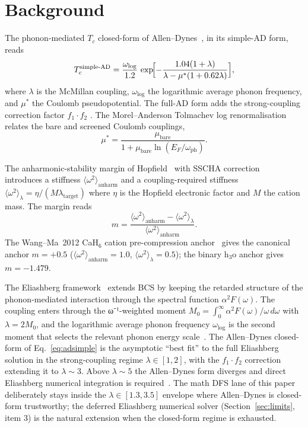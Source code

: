 \documentclass[11pt,a4paper]{article}
\begin{document}
\section{Background}
\label{sec:bg}

The phonon-mediated $T_c$ closed-form of Allen--Dynes~\cite{allenDynes1975},
in its simple-AD form, reads
\begin{equation}
\label{eq:adsimple}
T_c^{\text{simple-AD}} = \frac{\omega_{\log}}{1.2}\,
\exp\!\Bigl[-\frac{1.04(1+\lambda)}{\lambda-\mu^*(1+0.62\lambda)}\Bigr],
\end{equation}
where $\lambda$ is the McMillan coupling, $\omega_{\log}$ the logarithmic
average phonon frequency, and $\mu^*$ the Coulomb pseudopotential. The
full-AD form adds the strong-coupling correction factor
$f_1\!\cdot\!f_2$ \cite{allenDynes1975}. The Morel--Anderson Tolmachev
log renormalisation~\cite{morelAnderson1962} relates the bare and screened
Coulomb couplings,
\begin{equation}
\label{eq:ma}
\mu^* = \frac{\mu_{\text{bare}}}{1+\mu_{\text{bare}}\ln(E_F/\omega_{\text{ph}})}.
\end{equation}

The anharmonic-stability margin of Hopfield~\cite{hopfield1969} with
SSCHA correction~\cite{errea2014sscha} introduces a stiffness
$\langle\omega^2\rangle_{\text{anharm}}$ and a coupling-required stiffness
$\langle\omega^2\rangle_\lambda=\eta/(M\lambda_{\text{target}})$ where
$\eta$ is the Hopfield electronic factor and $M$ the cation mass. The
margin reads
\begin{equation}
\label{eq:margin}
m = \frac{\langle\omega^2\rangle_{\text{anharm}}-\langle\omega^2\rangle_\lambda}
       {\langle\omega^2\rangle_{\text{anharm}}}.
\end{equation}
The Wang--Ma~2012 CaH$_6$ cation pre-compression anchor~\cite{wangMa2012}
gives the canonical anchor $m=+0.5$ (\(\langle\omega^2\rangle_{\text{anharm}}=1.0\),
\(\langle\omega^2\rangle_\lambda=0.5\)); the binary h$_3$o anchor gives
$m=-1.479$.

\medskip
\noindent The Eliashberg framework~\cite{carbotte1990} extends BCS by
keeping the retarded structure of the phonon-mediated interaction
through the spectral function $\alpha^2 F(\omega)$. The coupling enters
through the ω⁻¹-weighted moment
$M_0 = \int_0^\infty \alpha^2 F(\omega)/\omega\,d\omega$ with
$\lambda = 2 M_0$, and the logarithmic average phonon frequency
$\omega_{\log}$ is the second moment that selects the relevant phonon
energy scale~\cite{allenDynes1975}. The Allen--Dynes closed-form
of Eq.~\ref{eq:adsimple} is the asymptotic ``best fit'' to the full
Eliashberg solution in the strong-coupling regime $\lambda\in[1,2]$,
with the $f_1\!\cdot\!f_2$ correction extending it to $\lambda\sim 3$.
Above $\lambda\sim 5$ the Allen--Dynes form diverges and direct
Eliashberg numerical integration is required~\cite{carbotte1990}.
The math DFS lane of this paper deliberately stays inside the
$\lambda\in[1.3, 3.5]$ envelope where Allen--Dynes is closed-form
trustworthy; the deferred Eliashberg numerical solver
(Section~\ref{sec:limits}, item 3) is the natural extension when the
closed-form regime is exhausted.
\end{document}
